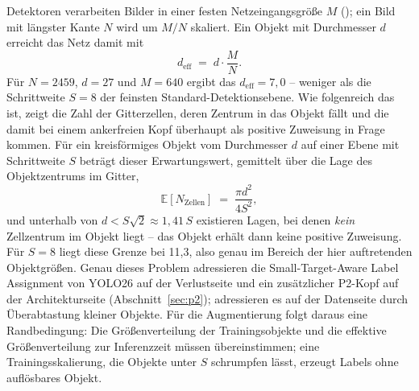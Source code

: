 Detektoren verarbeiten Bilder in einer festen Netzeingangsgröße $M$
(); ein Bild mit längster Kante $N$ wird um $M/N$ skaliert. Ein
Objekt mit Durchmesser $d$ erreicht das Netz damit mit
\begin{equation}
d_{\text{eff}} \;=\; d \cdot \frac{M}{N} .
\label{eq:deff}
\end{equation}
Für $N = 2459$, $d = 27$\px{} und $M = 640$ ergibt das
$d_{\text{eff}} = 7{,}0$\px{} -- weniger als die Schrittweite $S = 8$ der
feinsten Standard-Detektionsebene. Wie folgenreich das ist, zeigt die Zahl der
Gitterzellen, deren Zentrum in das Objekt fällt und die damit bei einem
ankerfreien Kopf überhaupt als positive Zuweisung in Frage kommen. Für ein
kreisförmiges Objekt vom Durchmesser $d$ auf einer Ebene mit Schrittweite $S$
beträgt dieser Erwartungswert, gemittelt über die Lage des Objektzentrums im
Gitter,
\begin{equation}
\mathbb{E}[N_{\text{Zellen}}] \;=\; \frac{\pi d^2}{4 S^2} ,
\label{eq:zellen}
\end{equation}
und unterhalb von $d < S\sqrt{2} \approx 1{,}41\,S$ existieren Lagen, bei denen
\emph{kein} Zellzentrum im Objekt liegt -- das Objekt erhält dann keine positive
Zuweisung. Für $S = 8$ liegt diese Grenze bei 11,3\px, also genau im Bereich der
hier auftretenden Objektgrößen. Genau dieses Problem adressieren die
Small-Target-Aware Label Assignment von YOLO26 auf der Verlustseite und ein
zusätzlicher P2-Kopf auf der Architekturseite (Abschnitt~\ref{sec:p2});
\textcite{kisantal2019} adressieren es auf der Datenseite durch Überabtastung
kleiner Objekte. Für die Augmentierung folgt daraus eine Randbedingung: Die
Größenverteilung der Trainingsobjekte und die effektive Größenverteilung zur
Inferenzzeit müssen übereinstimmen; eine Trainingsskalierung, die Objekte unter
$S$ schrumpfen lässt, erzeugt Labels ohne auflösbares Objekt.

